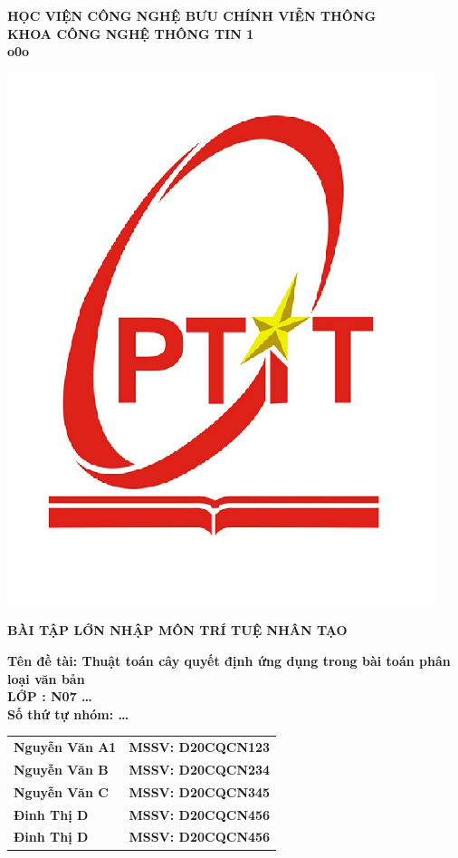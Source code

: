 \documentclass[BTL.tex]{subfiles}
\begin{document}
\begin{titlepage}
\thispagestyle{empty}
\begin{center}

{\textbf{\large{HỌC VIỆN CÔNG NGHỆ BƯU CHÍNH VIỄN THÔNG}}}\\
{\textbf{\large{KHOA CÔNG NGHỆ THÔNG TIN 1}}}\\
{\textbf{\large{\underline{\hspace{3cm}} o0o \underline{\hspace{3cm}}}}}\\
\begin{center}
\includegraphics[width=0.35\linewidth]{Hinhve/ptit_logo_1.png}
\end{center}


{\textbf{\huge{BÀI TẬP LỚN NHẬP MÔN TRÍ TUỆ NHÂN TẠO}}}\\[1cm]
{\textbf{\Large{Tên đề tài: Thuật toán cây quyết định ứng dụng trong bài toán phân loại văn bản}}\\[1cm]


{\textbf{\large{ LỚP : N07 \ldots }}}\\
{\textbf{\large{Số thứ tự nhóm: \ldots }}}\\

\vspace{1cm}
\begin{tabular}{ll}
{\textbf{\large{Nguyễn Văn A1 }}} & {\textbf{\large{MSSV: D20CQCN123}}} \\
{\textbf{\large{Nguyễn Văn B }}}  & {\textbf{\large{MSSV: D20CQCN234}}} \\
{\textbf{\large{Nguyễn Văn C }}}  & {\textbf{\large{MSSV: D20CQCN345}}} \\
{\textbf{\large{Đinh Thị D }}}   & {\textbf{\large{MSSV: D20CQCN456}}}\\
{\textbf{\large{Đinh Thị D }}}   & {\textbf{\large{MSSV: D20CQCN456}}}
\end{tabular}

}
\end{center}
\end{titlepage}
\end{document}
